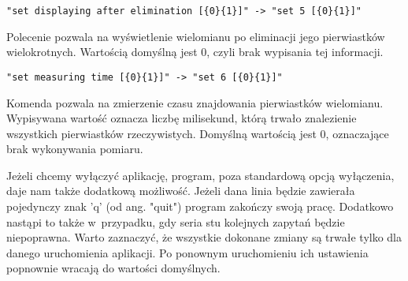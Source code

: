 \begin{lstlisting}
"set displaying after elimination [{0}{1}]" -> "set 5 [{0}{1}]"
\end{lstlisting}

Polecenie pozwala na wyświetlenie wielomianu po eliminacji jego pierwiastków wielokrotnych. Wartością domyślną jest $0$, czyli brak wypisania tej informacji.

\begin{lstlisting}
"set measuring time [{0}{1}]" -> "set 6 [{0}{1}]"
\end{lstlisting}

Komenda pozwala na zmierzenie czasu znajdowania pierwiastków wielomianu. Wypisywana wartość oznacza liczbę milisekund, którą trwało znalezienie wszystkich pierwiastków rzeczywistych. Domyślną wartością jest $0$, oznaczające brak wykonywania pomiaru.

Jeżeli chcemy wyłączyć aplikację, program, poza standardową opcją wyłączenia, daje nam także dodatkową możliwość. Jeżeli dana linia będzie zawierała pojedynczy znak 'q' (od ang. "quit") program zakończy swoją pracę. Dodatkowo nastąpi to także w~przypadku, gdy seria stu kolejnych zapytań będzie niepoprawna. Warto zaznaczyć, że wszystkie dokonane zmiany są trwałe tylko dla danego uruchomienia aplikacji. Po ponownym uruchomieniu ich ustawienia popnownie wracają do wartości domyślnych.

